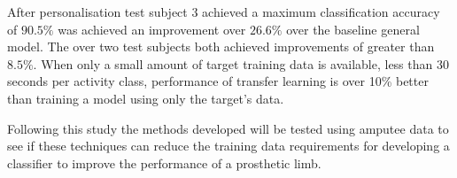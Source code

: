 After personalisation test subject 3 achieved a maximum classification accuracy of $90.5\%$ was achieved an improvement over $26.6\%$ over the baseline general model. The over two test subjects both achieved improvements of greater than $8.5\%$. When only a small amount of target training data is available, less than 30 seconds per activity class, performance of transfer learning is over 10\% better than training a model using only the target's data.

Following this study the methods developed will be tested using amputee data to see if these techniques can reduce the training data requirements for developing a classifier to improve the performance of a prosthetic limb.
